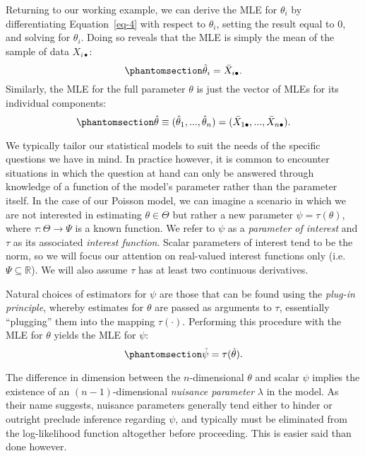\documentclass[
  12pt]{article}
\begin{document}
Returning to our working example, we can derive the MLE for \(\theta_i\)
by differentiating Equation~\ref{eq-4} with respect to \(\theta_i\),
setting the result equal to 0, and solving for \(\theta_i\). Doing so
reveals that the MLE is simply the mean of the sample of data
\(X_{i\bullet}\): \begin{equation}\phantomsection\label{eq-5}{
\hat{\theta}_i = \bar{X}_{i\bullet}.
}\end{equation} Similarly, the MLE for the full parameter \(\theta\) is
just the vector of MLEs for its individual components:
\begin{equation}\phantomsection\label{eq-6}{
\hat{\theta} \equiv (\hat{\theta}_1, ..., \hat{\theta}_n) = (\bar{X}_{1\bullet}, ..., \bar{X}_{n\bullet}).
}\end{equation}

We typically tailor our statistical models to suit the needs of the
specific questions we have in mind. In practice however, it is common to
encounter situations in which the question at hand can only be answered
through knowledge of a function of the model's parameter rather than the
parameter itself. In the case of our Poisson model, we can imagine a
scenario in which we are not interested in estimating
\(\theta \in \Theta\) but rather a new parameter
\(\psi = \tau(\theta)\), where \(\tau: \Theta \to \Psi\) is a known
function. We refer to \(\psi\) as a \emph{parameter of interest} and
\(\tau\) as its associated \emph{interest function}. Scalar parameters
of interest tend to be the norm, so we will focus our attention on
real-valued interest functions only
(i.e.~\(\Psi \subseteq \mathbb{R}\)). We will also assume \(\tau\) has
at least two continuous derivatives.

Natural choices of estimators for \(\psi\) are those that can be found
using the \emph{plug-in principle}, whereby estimates for \(\theta\) are
passed as arguments to \(\tau\), essentially ``plugging'' them into the
mapping \(\tau(\cdot)\). Performing this procedure with the MLE for
\(\theta\) yields the MLE for \(\psi\):
\begin{equation}\phantomsection\label{eq-7}{
\hat{\psi} = \tau(\hat{\theta}).
}\end{equation}

The difference in dimension between the \(n\)-dimensional \(\theta\) and
scalar \(\psi\) implies the existence of an \((n-1)\)-dimensional
\emph{nuisance parameter} \(\lambda\) in the model. As their name
suggests, nuisance parameters generally tend either to hinder or
outright preclude inference regarding \(\psi\), and typically must be
eliminated from the log-likelihood function altogether before
proceeding. This is easier said than done however.
\end{document}
